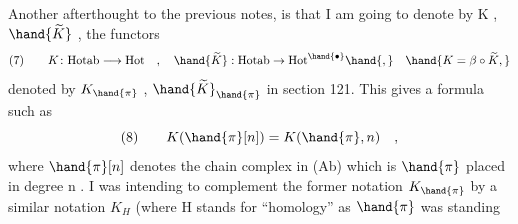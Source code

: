 Another afterthought to the previous notes, is that I am going to
denote by K , $\hand{\widetilde{K}}$ , the functors
\[ (7) \qquad K\colon \mathrm{Hotab} \longrightarrow \mathrm{Hot} \quad , \quad \hand{\widetilde{K}} : \mathrm{Hotab} \to \mathrm{Hot}^{\hand{\bullet}} \hand{,} \quad \hand{K=\beta\circ\widetilde{K} ,} \]
denoted by $K_{\hand{\pi}}$ , $\hand{\widetilde{K}}_{\hand{\pi}}$ in section 121. This gives a formula such as
\[ (8) \qquad K(\hand{\pi}[n]) = K(\hand{\pi},n) \quad , \]
where $\hand{\pi}[n]$ denotes the chain complex in (Ab) which is $\hand{\pi}$ placed in degree
n . I was intending to complement the  former notation $K_{\hand{\pi}}$ by a
similar notation $K_H$ (where H stands for ``homology''\hand{,} as $\hand{\pi}$ was standing

